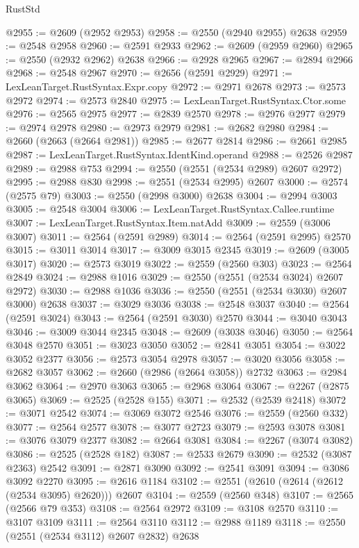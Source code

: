 \begin{lexlean}{RustStd}
\begin{coremodule}
@2955 := @2609 (@2952 @2953)
@2958 := @2550 (@2940 @2955) @2638
@2959 := @2548 @2958
@2960 := @2591 @2933
@2962 := @2609 (@2959 @2960)
@2965 := @2550 (@2932 @2962) @2638
@2966 := @2928 @2965
@2967 := @2894 @2966
@2968 := @2548 @2967
@2970 := @2656 (@2591 @2929)
@2971 := LexLeanTarget.RustSyntax.Expr.copy
@2972 := @2971 @2678
@2973 := @2573 @2972
@2974 := @2573 @2840
@2975 := LexLeanTarget.RustSyntax.Ctor.some
@2976 := @2565 @2975
@2977 := @2839 @2570
@2978 := @2976 @2977
@2979 := @2974 @2978
@2980 := @2973 @2979
@2981 := @2682 @2980
@2984 := @2660 (@2663 (@2664 @2981))
@2985 := @2677 @2814
@2986 := @2661 @2985
@2987 := LexLeanTarget.RustSyntax.IdentKind.operand
@2988 := @2526 @2987
@2989 := @2988 @753
@2994 := @2550 (@2551 (@2534 @2989) @2607 @2972)
@2995 := @2988 @830
@2998 := @2551 (@2534 @2995) @2607
@3000 := @2574 (@2575 @79)
@3003 := @2550 (@2998 @3000) @2638
@3004 := @2994 @3003
@3005 := @2548 @3004
@3006 := LexLeanTarget.RustSyntax.Callee.runtime
@3007 := LexLeanTarget.RustSyntax.Item.natAdd
@3009 := @2559 (@3006 @3007)
@3011 := @2564 (@2591 @2989)
@3014 := @2564 (@2591 @2995) @2570
@3015 := @3011 @3014
@3017 := @3009 @3015 @2345
@3019 := @2609 (@3005 @3017)
@3020 := @2573 @3019
@3022 := @2559 (@2560 @303)
@3023 := @2564 @2849
@3024 := @2988 @1016
@3029 := @2550 (@2551 (@2534 @3024) @2607 @2972)
@3030 := @2988 @1036
@3036 := @2550 (@2551 (@2534 @3030) @2607 @3000) @2638
@3037 := @3029 @3036
@3038 := @2548 @3037
@3040 := @2564 (@2591 @3024)
@3043 := @2564 (@2591 @3030) @2570
@3044 := @3040 @3043
@3046 := @3009 @3044 @2345
@3048 := @2609 (@3038 @3046)
@3050 := @2564 @3048 @2570
@3051 := @3023 @3050
@3052 := @2841 @3051
@3054 := @3022 @3052 @2377
@3056 := @2573 @3054 @2978
@3057 := @3020 @3056
@3058 := @2682 @3057
@3062 := @2660 (@2986 (@2664 @3058)) @2732
@3063 := @2984 @3062
@3064 := @2970 @3063
@3065 := @2968 @3064
@3067 := @2267 (@2875 @3065)
@3069 := @2525 (@2528 @155)
@3071 := @2532 (@2539 @2418)
@3072 := @3071 @2542
@3074 := @3069 @3072 @2546
@3076 := @2559 (@2560 @332)
@3077 := @2564 @2577
@3078 := @3077 @2723
@3079 := @2593 @3078
@3081 := @3076 @3079 @2377
@3082 := @2664 @3081
@3084 := @2267 (@3074 @3082)
@3086 := @2525 (@2528 @182)
@3087 := @2533 @2679
@3090 := @2532 (@3087 @2363) @2542
@3091 := @2871 @3090
@3092 := @2541 @3091
@3094 := @3086 @3092 @2270
@3095 := @2616 @1184
@3102 := @2551 (@2610 (@2614 (@2612 (@2534 @3095) @2620))) @2607
@3104 := @2559 (@2560 @348)
@3107 := @2565 (@2566 @79 @353)
@3108 := @2564 @2972
@3109 := @3108 @2570
@3110 := @3107 @3109
@3111 := @2564 @3110
@3112 := @2988 @1189
@3118 := @2550 (@2551 (@2534 @3112) @2607 @2832) @2638

\end{coremodule}
\end{lexlean}
